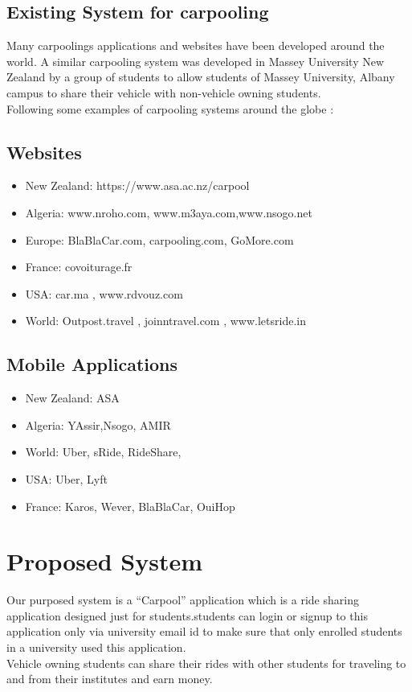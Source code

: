 \subsection{Existing System for carpooling}
Many carpoolings applications and websites have been developed around the world. A similar carpooling system was developed in Massey University New Zealand by a group of students to allow students of Massey University, Albany campus to share their vehicle with non-vehicle owning students.
\\ Following some examples of carpooling systems around the globe : 
\subsection{Websites}
\begin{itemize}

\item New Zealand: https://www.asa.ac.nz/carpool
\item Algeria: www.nroho.com, www.m3aya.com,www.nsogo.net
\item Europe: BlaBlaCar.com, carpooling.com, GoMore.com
\item France: covoiturage.fr
\item USA: car.ma , www.rdvouz.com
\item World: Outpost.travel , joinntravel.com , www.letsride.in

\end{itemize}

\subsection{Mobile Applications}
\begin{itemize}

\item New Zealand: ASA
\item Algeria: YAssir,Nsogo, AMIR
\item World: Uber, sRide, RideShare, 
\item USA: Uber, Lyft
\item France: Karos, Wever, BlaBlaCar, OuiHop

\end{itemize}
\section{Proposed System}
Our purposed system is a “Carpool” application which is a ride sharing application designed just for students.students can login or signup to this application only via university email id to make sure that only enrolled students in a university used this application.
\\ Vehicle owning students can share their rides with other students for traveling to and from their institutes and earn money.

